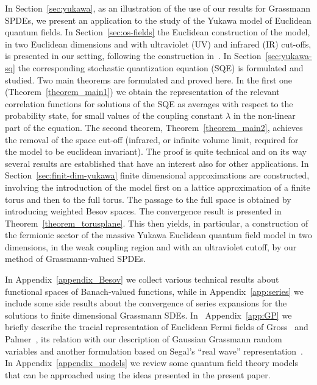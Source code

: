 \documentclass[11pt]{article}
\begin{document}
In Section~\ref{sec:yukawa}, as an illustration of the use of our results for
Grassmann SPDEs, we present an application to the study of the Yukawa model of
Euclidean quantum fields. In Section~\ref{sec:os-fields} the Euclidean
construction of the model, in two Euclidean dimensions and with ultraviolet
(UV) and infrared (IR) cut-offs, is presented in our setting, following the
construction in~{\cite{osterwalder_euclidean_1973-2}}. In
Section~\ref{sec:yukawa-sq} the corresponding stochastic quantization equation
(SQE) is formulated and studied. Two main theorems are formulated and proved
here. In the first one (Theorem~\ref{theorem_main1}) we obtain the
representation of the relevant correlation functions for solutions of the SQE
as averages with respect to the probability state, for small values of the
coupling constant $\lambda$ in the non-linear part of the equation. The second
theorem, Theorem~\ref{theorem_main2}, achieves the removal of the space
cut-off (infrared, or infinite volume limit, required for the model to be
euclidean invariant). The proof is quite technical and on its way several
results are established that have an interest also for other applications. In
Section~\ref{sec:finit-dim-yukawa} finite dimensional approximations are
constructed, involving the introduction of the model first on a lattice
approximation of a finite torus and then to the full torus. The passage to the
full space is obtained by introducing weighted Besov spaces. The convergence
result is presented in Theorem~\ref{theorem_torusplane}. This then yields, in
particular, a construction of the fermionic sector of the massive Yukawa
Euclidean quantum field model in two dimensions, in the weak coupling region
and with an ultraviolet cutoff, by our method of Grassmann-valued SPDEs.

In Appendix~\ref{appendix_Besov} we collect various technical results about
functional spaces of Banach-valued functions, while in
Appendix~\ref{app:series} we include some side results about the convergence
of series expansions for the solutions to finite dimensional Grassmann SDEs.
In \ Appendix~\ref{app:GP} we briefly describe the tracial representation of
Euclidean Fermi fields of Gross~{\cite{Gross_Euclidean_1976}} and
Palmer~{\cite{palmer_euclidean_1980}}, its relation with our description of
Gaussian Grassmann random variables and another formulation based on Segal's
``real wave'' representation~{\cite{Segalbook}}. In
Appendix~\ref{appendix_models} we review some quantum field theory models that
can be approached using the ideas presented in the present paper.
\end{document}
